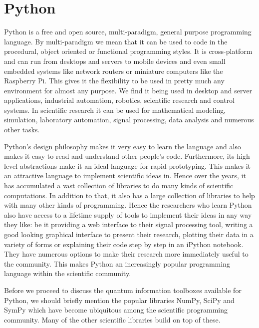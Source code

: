 \pagebreak

\section{Python}
Python \cite{python} \cite{primerscientificpython} is a free and open source, multi-paradigm, general purpose programming language. By multi-paradigm we mean that it can be used to code in the procedural, object oriented or functional programming styles. It is cross-platform and can run from desktops and servers to mobile devices and even small embedded systems like network routers or miniature computers like the Raspberry Pi. This gives it the flexibility to be used in pretty much any environment for almost any purpose. We find it being used in desktop and server applications, industrial automation, robotics, scientific research and control systems. In scientific research it can be used for mathematical modeling, simulation, laboratory automation, signal processing, data analysis and numerous other tasks.
\par Python's design philosophy makes it very easy to learn the language and also makes it easy to read and understand other people's code. Furthermore, its high level abstractions make it an ideal language for rapid prototyping. This makes it an attractive language to implement scientific ideas in. Hence over the years, it has accumulated a vast collection of libraries to do many kinds of scientific computations. In addition to that, it also has a large collection of libraries to help with many other kinds of programming. Hence the researchers who learn Python also have access to a lifetime supply of tools to implement their ideas in any way they like: be it providing a web interface to their signal processing tool, writing a good looking graphical interface to present their research, plotting their data in a variety of forms or explaining their code step by step in an iPython notebook. They have numerous options to make their research more immediately useful to the community. This makes Python an increasingly popular programming language within the scientific community.
\par Before we proceed to discuss the quantum information toolboxes available for Python, we should briefly mention the popular libraries NumPy, SciPy and SymPy which have become ubiquitous among the scientific programming community. Many of the other scientific libraries build on top of these.

